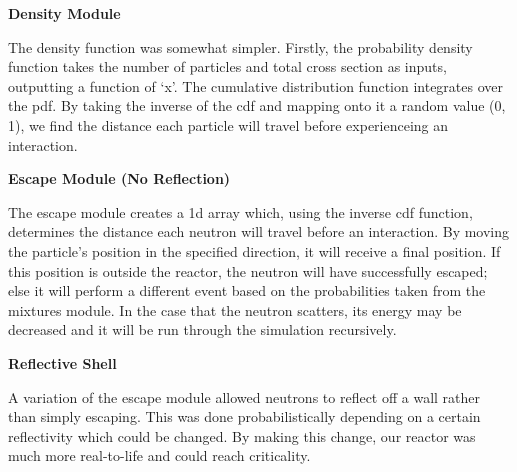 \documentclass{notes}
\begin{document}
\textbf{Density Module}

The density function was somewhat simpler. Firstly, the probability density function takes the number of particles and total cross section as inputs, outputting a function of `x'. The cumulative distribution function integrates over the pdf. By taking the inverse of the cdf and mapping onto it a random value (0, 1), we find the distance each particle will travel before experienceing an interaction.

\textbf{Escape Module (No Reflection)}

The escape module creates a 1d array which, using the inverse cdf function, determines the distance each neutron will travel before an interaction. By moving the particle's position in the specified direction, it will receive a final position. If this position is outside the reactor, the neutron will have successfully escaped; else it will perform a different event based on the probabilities taken from the mixtures module. In the case that the neutron scatters, its energy may be decreased and it will be run through the simulation recursively.

\textbf{Reflective Shell}

A variation of the escape module allowed neutrons to reflect off a wall rather than simply escaping. This was done probabilistically depending on a certain reflectivity which could be changed. By making this change, our reactor was much more real-to-life and could reach criticality.


\nocite{*}


\end{document}

